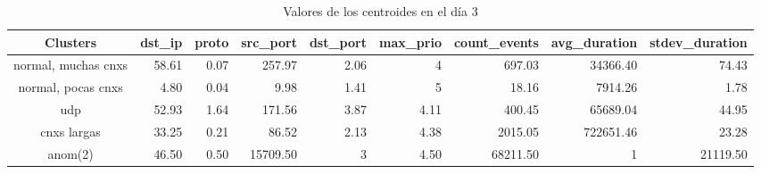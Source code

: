 \begin{table}[h]
    \begingroup
    \setlength{\tabcolsep}{2pt} %
    \hspace*{-3cm}
    \begin{tabular}{|c|r|r|r|r|r|r|r|r|}
    \hline
    \textbf{Clusters}   & \textbf{dst\_ip} & \textbf{proto} & \textbf{src\_port} & \textbf{dst\_port} & \textbf{max\_prio} & \textbf{count\_events} & \textbf{avg\_duration} & \textbf{stdev\_duration} \\ \hline
    normal, muchas cnxs & 58.61            & 0.07           & 257.97             & 2.06               & 4                  & 697.03                 & 34366.40               & 74.43                    \\ \hline
    normal, pocas cnxs  & 4.80             & 0.04           & 9.98               & 1.41               & 5                  & 18.16                  & 7914.26                & 1.78                     \\ \hline
    udp                 & 52.93            & 1.64           & 171.56             & 3.87               & 4.11               & 400.45                 & 65689.04               & 44.95                    \\ \hline
    cnxs largas         & 33.25            & 0.21           & 86.52              & 2.13               & 4.38               & 2015.05                & 722651.46              & 23.28                    \\ \hline
    anom(2)             & 46.50            & 0.50           & 15709.50           & 3                  & 4.50               & 68211.50               & 1                      & 21119.50                 \\ \hline
    \end{tabular}
    \endgroup
\caption{Valores de los centroides en el día 3}
\label{tab:dia3}
\end{table}

